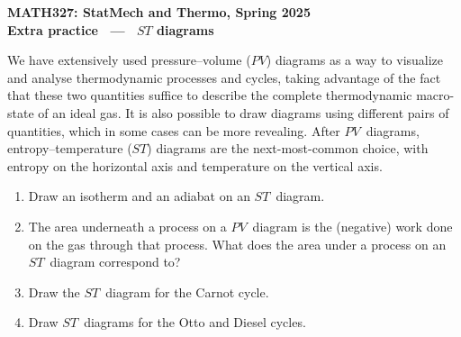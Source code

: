 \documentclass[12 pt]{article} %
\begin{document}
\newcommand{\thisunit}{MATH327 Extra ($ST$~diagrams)}
\newcommand{\moddate}{Last modified 26 Apr.~2025}
\begin{center}
  {\Large \textbf{MATH327: StatMech and Thermo, Spring 2025}} \\[12 pt]
  {\Large \textbf{Extra practice \ --- \ $ST$ diagrams}} \\[24 pt]
\end{center}

We have extensively used pressure--volume ($PV$) diagrams as a way to visualize and analyse thermodynamic processes and cycles, taking advantage of the fact that these two quantities suffice to describe the complete thermodynamic macro-state of an ideal gas.
It is also possible to draw diagrams using different pairs of quantities, which in some cases can be more revealing.
After $PV$~diagrams, entropy--temperature ($ST$) diagrams are the next-most-common choice, with entropy on the horizontal axis and temperature on the vertical axis.

\begin{enumerate}[label={(\alph*)}]
  \item Draw an isotherm and an adiabat on an $ST$~diagram.

  \item The area underneath a process on a $PV$~diagram is the (negative) work done on the gas through that process.
        What does the area under a process on an $ST$~diagram correspond to?

  \item Draw the $ST$~diagram for the Carnot cycle.

  \item Draw $ST$~diagrams for the Otto and Diesel cycles.
\end{enumerate}
\end{document}
